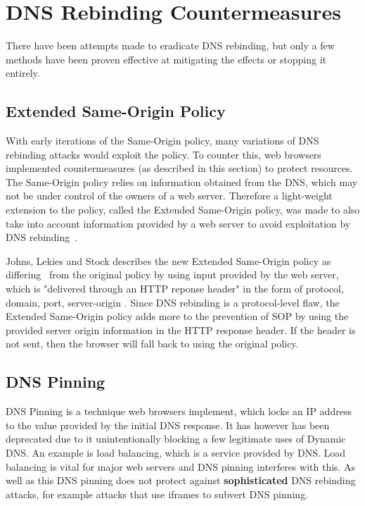 \chapter{DNS Rebinding Countermeasures}

There have been attempts made to eradicate DNS rebinding, but only
a few methods have been proven effective at mitigating the effects
or stopping it entirely.

\section{Extended Same-Origin Policy}

With early iterations of the Same-Origin policy, many variations of
DNS rebinding attacks would exploit the policy. To counter this, web
browsers implemented countermeasures (as described in this section) to
protect resources. The Same-Origin policy relies on information
obtained from the DNS, which may not be under control of the owners
of a web server. Therefore a light-weight extension to the policy,
called the Extended Same-Origin policy, was made to also take into
account information provided by a web server to avoid exploitation by
DNS rebinding~\cite{johns2013eradicating}.

\vspace{0.5cm}

Johns, Lekies and Stock describes the new Extended Same-Origin policy
as differing~\cite{johns2013eradicating} from the original policy by using input provided by the
web server, which is "delivered through an HTTP reponse header" in the
form of { protocol, domain, port, server-origin }. Since DNS rebinding is
a protocol-level flaw, the Extended Same-Origin policy adds more to the
prevention of SOP by using the provided server origin information in the
HTTP response header. If the header is not sent, then the browser will fall
back to using the original policy.

\section{DNS Pinning}

DNS Pinning is a technique web browsers implement, which locks an IP
address to the value provided by the initial DNS response. It has
however has been deprecated due to it unintentionally blocking a
few legitimate uses of Dynamic DNS. An example is load balancing,
which is a service provided by DNS. Load balancing is vital for
major web servers and DNS pinning interferes with this.
As well as this DNS pinning does not protect against \textbf{sophisticated} DNS
rebinding attacks, for example attacks that use iframes to subvert DNS pinning.

